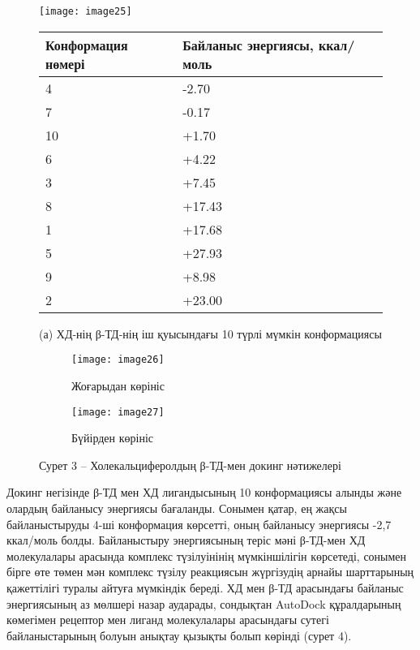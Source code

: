 \begin{figure}[H]
\centering
\begin{minipage}{0.4\textwidth}
\centering
\texttt{[image: image25]}
\end{minipage}
\hfill
\begin{minipage}{0.4\textwidth}
\centering
\begin{tabular}{|p{}|p{}|}
\hline
\textbf{Конформация нөмері} & \textbf{Байланыс энергиясы, ккал/моль} \\
\hline
4 & -2.70 \\
7 & -0.17 \\
10 & +1.70 \\
6 & +4.22 \\
3 & +7.45 \\
8 & +17.43 \\
1 & +17.68 \\
5 & +27.93 \\
9 & +8.98 \\
2 & +23.00 \\
\hline
\end{tabular}
\end{minipage}
\caption*{(а) ХД-нің β-ТД-нің іш қуысындағы 10 түрлі мүмкін конформациясы}
\end{figure}

\begin{figure}[H]
\centering
\begin{subfigure}[b]{0.4\textwidth}
\centering
\texttt{[image: image26]}
\caption*{Жоғарыдан көрініс}
\end{subfigure}
\hfill
\begin{subfigure}[b]{0.4\textwidth}
\centering
\texttt{[image: image27]}
\caption*{Бүйірден көрініс}
\end{subfigure}
\caption*{(b) Ең жақсы байланысқан конформация (байланыс энергиясы = –2.7 ккал/моль)}
\caption*{Сурет 3 – Холекальциферолдың β-ТД-мен докинг нәтижелері}
\end{figure}

\begin{multicols}{2}
Докинг негізінде β-ТД мен ХД лигандысының 10 конформациясы алынды және
олардың байланысу энергиясы бағаланды. Сонымен қатар, ең жақсы
байланыстыруды 4-ші конформация көрсетті, оның байланысу энергиясы -2,7
ккал/моль болды. Байланыстыру энергиясының теріс мәні β-ТД-мен ХД
молекулалары арасында комплекс түзілуінінің мүмкіншілігін көрсетеді,
сонымен бірге өте төмен мән комплекс түзілу реакциясын жүргізудің арнайы
шарттарының қажеттілігі туралы айтуға мүмкіндік береді. ХД мен β-ТД
арасындағы байланыс энергиясының аз мөлшері назар аударады, сондықтан
AutoDock құралдарының көмегімен рецептор мен лиганд молекулалары
арасындағы сутегі байланыстарының болуын анықтау қызықты болып көрінді
(сурет 4).
\end{multicols}

